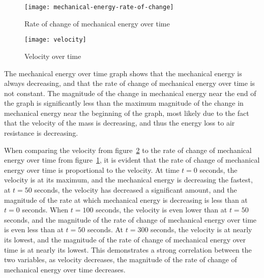 \documentclass[titlepage]{article}
\begin{document}
            \begin{minipage}{.5\textwidth}
                \begin{figure}[H]
                    \centering
                    \texttt{[image: mechanical-energy-rate-of-change]}
                    \small \caption{ \small Rate of change of mechanical energy over time}
                    \label{fig:mechanical-energy-rate-of-change}
                \end{figure}
            \end{minipage}%
            \begin{minipage}{.5\textwidth}
                \begin{figure}[H]
                    \centering
                    \texttt{[image: velocity]}
                    \small \caption{ \small Velocity over time}
                    \label{fig:velocity1}
                \end{figure}
            \end{minipage}
            
            The mechanical energy over time graph shows that the mechanical energy is always decreasing, and that the rate of change of mechanical energy over time is not constant.
            The magnitude of the change in mechanical energy near the end of the graph is significantly less than the maximum magnitude of the change in mechanical energy near the beginning of the graph, most likely due to the fact that the velocity of the mass is decreasing, and thus the energy loss to air resistance is decreasing.
            
            When comparing the velocity from figure~\ref{fig:velocity1} to the rate of change of mechanical energy over time from figure~\ref{fig:mechanical-energy-rate-of-change}, it is evident that the rate of change of mechanical energy over time is proportional to the velocity.
            At time $t=0$ seconds, the velocity is at its maximum, and the mechanical energy is decreasing the fastest, at $t=50$ seconds, the velocity has decreased a significant amount, and the magnitude of the rate at which mechanical energy is decreasing is less than at $t=0$ seconds.
            When $t=100$ seconds, the velocity is even lower than at $t=50$ seconds, and the magnitude of the rate of change of mechanical energy over time is even less than at $t=50$ seconds.
            At $t=300$ seconds, the velocity is at nearly its lowest, and the magnitude of the rate of change of mechanical energy over time is at nearly its lowest.
            This demonstrates a strong correlation between the two variables, as velocity decreases, the magnitude of the rate of change of mechanical energy over time decreases.
    
\end{document}
